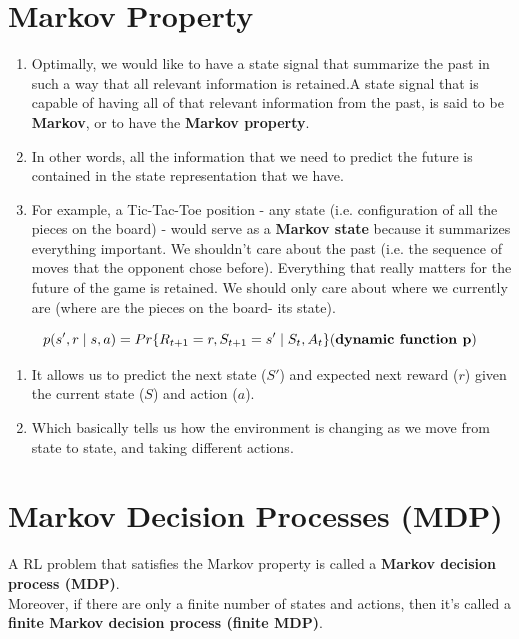 \section{Markov Property \cite{medium-introduction-to-reinforcement-learning-rl-part-3-finite-markov-decision-processes-51e1f8d3ddb7}}\label{RL: Markov Property}
\begin{enumerate}
    \item Optimally, we would like to have a state signal that summarize the past in such a way that all relevant information is retained.A state signal that is capable of having all of that relevant information from the past, is said to be \textbf{Markov}, or to have the \textbf{Markov property}.
    \item In other words, all the information that we need to predict the future is contained in the state representation that we have.
    \item For example, a Tic-Tac-Toe position - any state (i.e. configuration of all the pieces on the board) - would serve as a \textbf{Markov state} because it summarizes everything important. We shouldn’t care about the past (i.e. the sequence of moves that the opponent chose before). Everything that really matters for the future of the game is retained. We should only care about where we currently are (where are the pieces on the board- its state).
\end{enumerate}

\[
    p(s',r \mid s,a) = Pr\{R_{t+1} = r, S_{t+1}=s' \mid S_t,A_t\} \hfill (\text{\textbf{dynamic function p}})
\]

\begin{enumerate}
    \item It allows us to predict the next state ($S'$) and expected next reward ($r$) given the current state ($S$) and action ($a$).
    \item Which basically tells us how the environment is changing as we move from state to state, and taking different actions.
\end{enumerate}


\section{Markov Decision Processes (MDP) \cite{medium-introduction-to-reinforcement-learning-rl-part-3-finite-markov-decision-processes-51e1f8d3ddb7}}\label{RL: Markov Decision Processes (MDP)}
A RL problem that satisfies the Markov property is called a \textbf{Markov decision process (MDP)}.\\
Moreover, if there are only a finite number of states and actions, then it’s called a \textbf{finite Markov decision process (finite MDP)}.

